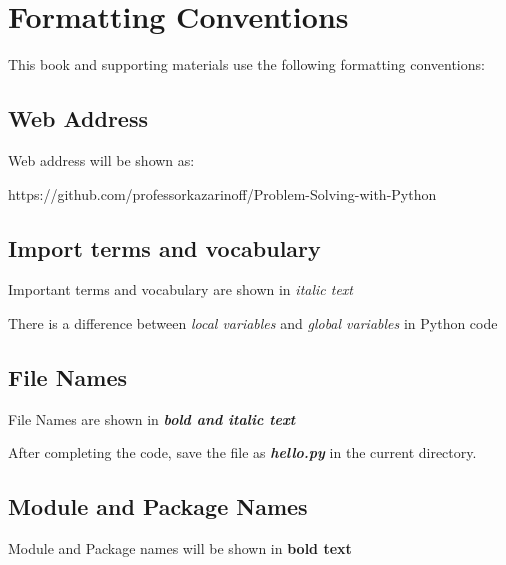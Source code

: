 \documentclass{book}
\begin{document}
    
        \section{Formatting Conventions}\label{formatting-conventions}
    




    
        This book and supporting materials use the following formatting
conventions:
    




    
        \subsection{Web Address}\label{web-address}

Web address will be shown as:

https://github.com/professorkazarinoff/Problem-Solving-with-Python
    




    
        \subsection{Import terms and
vocabulary}\label{import-terms-and-vocabulary}

Important terms and vocabulary are shown in \emph{italic text}

There is a difference between \emph{local variables} and \emph{global
variables} in Python code
    




    
        \subsection{File Names}\label{file-names}

File Names are shown in \textbf{\emph{bold and italic text}}

After completing the code, save the file as \textbf{\emph{hello.py}} in
the current directory.
    




    
        \subsection{Module and Package Names}\label{module-and-package-names}

Module and Package names will be shown in \textbf{bold text}
\end{document}
